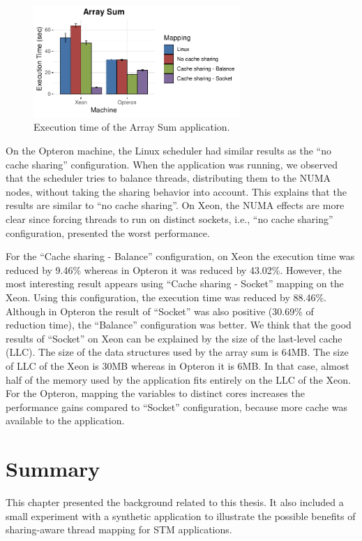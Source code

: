 \begin{figure}[!ht]
	\centering
	\includegraphics[width=0.7\textwidth]{figures/background/arraySum.pdf}
	\caption{Execution time of the Array Sum application.}
	\label{fig:arraySum}
\end{figure}


On the Opteron machine, the Linux scheduler had similar results as the ``no cache sharing''  configuration. When the application was running, we observed that the scheduler tries to balance threads, distributing them to the NUMA nodes, without taking the sharing behavior into account. This explains that the results are similar to ``no cache sharing''. On Xeon, the NUMA effects are more clear since forcing threads to run on distinct sockets, i.e., ``no cache sharing'' configuration, presented the worst performance.



For the ``Cache sharing - Balance'' configuration, on Xeon the execution time was reduced by 9.46\% whereas in Opteron it was reduced by 43.02\%. However, the most interesting result appears using ``Cache sharing - Socket'' mapping on the Xeon. Using this configuration, the execution time was reduced by 88.46\%. Although in Opteron the result of ``Socket'' was also positive (30.69\% of reduction time), the ``Balance'' configuration was better. We think that the good results of ``Socket'' on Xeon can be explained by the size of the last-level cache (LLC). The size of the data structures used by the array sum is 64MB. The size of LLC of the Xeon is 30MB whereas in Opteron it is 6MB. In that case, almost half of the memory used by the application fits entirely on the LLC of the Xeon. For the Opteron, mapping the variables to distinct cores increases the performance gains compared to ``Socket'' configuration, because more cache was available to the application.


\section{Summary}
This chapter presented the background related to this thesis. It also included a small experiment with a synthetic application to illustrate the possible benefits of sharing-aware thread mapping for STM applications.
